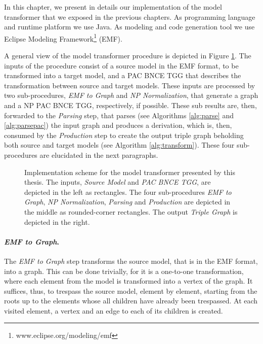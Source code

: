 In this chapter, we present in details our implementation of the model transformer that we exposed in the previous chapters. As programming language and runtime platform we use Java. As modeling and code generation tool we use Eclipse Modeling Framework\footnote{www.eclipse.org/modeling/emf} (EMF).

A general view of the model transformer procedure is depicted in Figure \ref{fig:implementation-scheme}. The inputs of the procedure consist of a source model in the EMF format, to be transformed into a target model, and a PAC BNCE TGG that describes the transformation between source and target models. These inputs are processed by two sub-procedures, \emph{EMF to Graph} and \emph{NP Normalization}, that generate a graph and a NP PAC BNCE TGG, respectively, if possible. These sub results are, then, forwarded to the \emph{Parsing} step, that parses (see Algorithms \ref{alg:parse} and \ref{alg:parsepac}) the input graph and produces a derivation, which is, then, consumed by the \emph{Production} step to create the output triple graph beholding both source and target models (see Algorithm \ref{alg:transform}). These four sub-procedures are elucidated in the next paragraphs.

\begin{figure}[h]
	
	\caption{Implementation scheme for the model transformer presented by this thesis. The inputs, \emph{Source Model} and \emph{PAC BNCE TGG}, are depicted in the left as rectangles. The four sub-procedures \emph{EMF to Graph}, \emph{NP Normalization}, \emph{Parsing} and \emph{Production} are depicted in the middle as rounded-corner rectangles. The output \emph{Triple Graph} is depicted in the right.}
	\label{fig:implementation-scheme}
\end{figure}

\paragraph*{\emph{EMF to Graph}.} The \emph{EMF to Graph} step transforms the source model, that is in the EMF format, into a graph. This can be done trivially, for it is a one-to-one transformation, where each element from the model is transformed into a vertex of the graph. It suffices, thus, to trespass the source model, element by element, starting from the roots up to the elements whose all children have already been trespassed. At each visited element, a vertex and an edge to each of its children is created.

